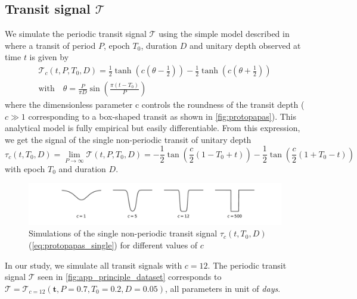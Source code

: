 \documentclass{aastex631}
\begin{document}
\subsection{Transit signal $\mathcal{T}$}\label{app_proto}
We simulate the periodic transit signal $\mathcal{T}$ using the simple model described in \cite{protopapas} where a transit of period $P$, epoch $T_0$, duration $D$ and unitary depth observed at time $t$ is given by
\begin{equation}
    \begin{gathered}
        \mathcal{T}_c(t, P, T_0, D) = \frac{1}{2}\tanh\left(c\left(\theta - \frac{1}{2}\right)\right) - \frac{1}{2}\tanh\left(c\left(\theta + \frac{1}{2}\right)\right) \\
        \text{with}\quad\theta = \frac{P}{\pi  D}\sin\left(\frac{\pi(t-T_0)}{P}\right)
    \end{gathered}
\end{equation}
where the dimensionless parameter c controls the roundness of the transit depth ($c\gg1$ corresponding to a box-shaped transit as shown in \autoref{fig:protopapas}). This analytical model is fully empirical but easily differentiable. From this expression, we get the signal of the single non-periodic transit of unitary depth 
\begin{equation}\label{eq:protopapas_single}
    \tau_c(t, T_0, D) = \lim_{P\to \infty} \mathcal{T}(t, P, T_0, D) = -\frac{1}{2}\tan\left(\frac{c}{2}(1-T_0+t)\right) -\frac{1}{2}\tan\left(\frac{c}{2}(1+T_0-t)\right)
\end{equation}
with epoch $T_0$ and duration $D$.

\begin{figure}[H]
    \begin{centering}
        \includegraphics[width=0.9\linewidth]{../figures/protopapas.pdf}
        \caption{Simulations of the single non-periodic transit signal $\tau_c(t, T_0, D)$ (\autoref{eq:protopapas_single}) for different values of $c$}
        \label{fig:protopapas}
    \end{centering}
\end{figure}
In our study, we simulate all transit signals with $c=12$. The periodic transit signal $\mathcal{T}$ seen in \autoref{fig:app_principle_dataset} corresponds to $\mathcal{T} = \mathcal{T}_{c=12}(\bm{t}, P=0.7, T_0=0.2, D=0.05)$, all parameters in unit of \textit{days}.
\end{document}
